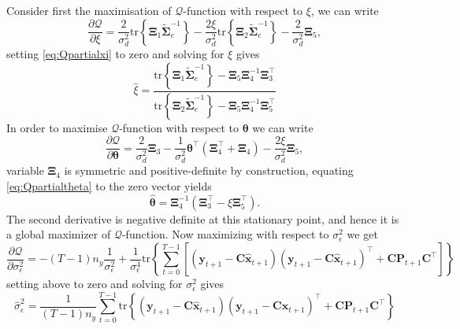 \documentclass[]{article}
\begin{document}
Consider first the maximisation of $\mathcal{Q}$-function with respect to $\xi$, we can write
\begin{equation}\label{eq:Qpartialxi}
 \frac{\partial \mathcal Q}{\partial\xi}=\frac{2}{\sigma_d^2}\mathrm{tr}\left\lbrace \boldsymbol\Xi_1 \tilde{\boldsymbol\Sigma}_e^{-1}\right\rbrace -\frac{2\xi}{\sigma_d^2}\mathrm{tr}\left\lbrace \boldsymbol\Xi_2 \tilde{\boldsymbol\Sigma}_e^{-1}\right\rbrace-\frac{2}{\sigma_d^2}\boldsymbol\Xi_5,
\end{equation}
setting \eqref{eq:Qpartialxi} to zero and solving for $\xi$ gives
\begin{equation}
 \hat{\xi}=\frac{\mathrm{tr}\left\lbrace \boldsymbol\Xi_1 \tilde{\boldsymbol\Sigma}_e^{-1}\right\rbrace-\boldsymbol\Xi_5\boldsymbol\Xi_4^{-1}\boldsymbol\Xi_3^\top}{\mathrm{tr}\left\lbrace \boldsymbol\Xi_2 \tilde{\boldsymbol\Sigma}_e^{-1}\right\rbrace-\boldsymbol\Xi_5\boldsymbol\Xi_4^{-1}\boldsymbol\Xi_5^{\top}}
\end{equation}
In order to maximise $\mathcal{Q}$-function with respect to $\boldsymbol\theta$ we can write
\begin{equation}\label{eq:Qpartialtheta}
 \frac{\partial \mathcal Q}{\partial \boldsymbol\theta}=\frac{2}{\sigma_d^2}\boldsymbol\Xi_3-\frac{1}{\sigma_d^2}\boldsymbol\theta^\top(\boldsymbol\Xi_4^\top+\boldsymbol\Xi_4)-\frac{2\xi}{\sigma_d^2}\boldsymbol\Xi_5,
\end{equation}
variable $\boldsymbol\Xi_4$ is symmetric and positive-definite by construction, equating \eqref{eq:Qpartialtheta} to the zero vector yields
\begin{equation}\label{eq:theta}
 \hat{\boldsymbol \theta}=\boldsymbol\Xi_4^{-1}\left(\boldsymbol\Xi_3^\top-\xi\boldsymbol\Xi_5^\top \right).
\end{equation}
The second derivative is negative definite at this stationary point, and hence it is a global maximizer of $\mathcal{Q}$-function. Now maximizing with respect to $\sigma_{\epsilon}^2$ we get
\begin{equation}
  \frac{\partial \mathcal Q}{\partial \sigma_{\epsilon}^2}=-(T-1)n_y\frac{1}{\sigma_{\epsilon}^2}+\frac{1}{\sigma_{\epsilon}^4}\mathrm{tr}\left\lbrace\sum_{t=0}^{T-1}\left[ (\mathbf y_{t+1}-\mathbf C\mathbf{\hat{x}}_{t+1}) (\mathbf y_{t+1}-\mathbf C\mathbf{\hat{x}}_{t+1})^\top+\mathbf C \mathbf P_{t+1}\mathbf C^\top\right] \right\rbrace
\end{equation}
setting above to zero and solving for $\sigma_{\epsilon}^2$ gives
\begin{equation}
 \hat{\sigma}_{\epsilon}^2=\frac{1}{(T-1)n_y}\sum_{t=0}^{T-1}\mathrm{tr}\left\lbrace (\mathbf y_{t+1}-\mathbf C\mathbf{\hat{x}}_{t+1}) (\mathbf y_{t+1}-\mathbf C\mathbf{\hat{x}}_{t+1})^\top+\mathbf C \mathbf P_{t+1}\mathbf C^\top \right\rbrace
\end{equation}
\end{document}
